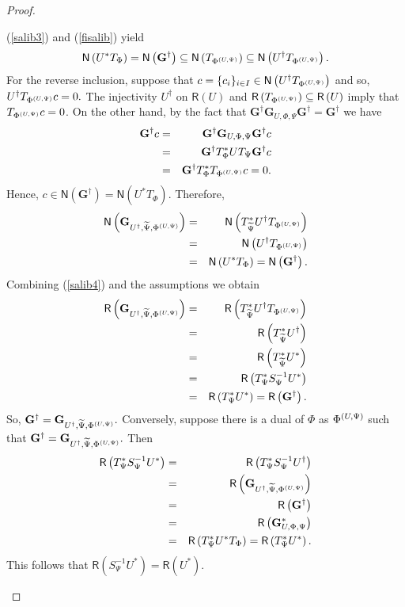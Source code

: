 \documentclass{birkjour}
\theoremstyle{definition}
\theoremstyle{remark}
\numberwithin{equation}{section}
\newcommand{\range}[1]{\mathsf{R}\left( #1 \right)}
\newcommand{\kernel}[1]{\mathsf{N}\left( #1 \right)}
\begin{document}
\begin{proof}
\begin{enumerate}
(\ref{salib3}) and (\ref{fisalib}) yield
\begin{eqnarray*}
\kernel{U^*T_{\Phi}}=\kernel{\mathbf{G}^{\dag}}\subseteq
\kernel{T_{\Phisd}}\subseteq \kernel{U^\dag T_{\Phisd}}.
\end{eqnarray*}
  For the reverse inclusion, suppose that
$c=\{c_i\}_{i\in I}\in \kernel{U^{\dag}T_{\Phisd}}$ and so,
$U^{\dag}T_{\Phi^{\left(U,\Psi\right)}}c=0.$  The injectivity $U^{\dag}$  on $\range{U}$  and  $\range{T_{\Phisd}}\subseteq \range{U}$  imply that  $T_{\Phi^{\left(U,\Psi\right)}}c=0$. On the other hand, by the fact that  $
\mathbf{G^{\dag}}\mathbf{G}_{U,\Phi,\Psi}\mathbf{G^{\dag}}=\mathbf{G^{\dag}}$
 we have
 \begin{eqnarray*}
 \mathbf{G^{\dag}}c&=&\mathbf{G^{\dag}}\mathbf{G}_{U,\Phi,\Psi}\mathbf{G^{\dag}}c\\
 &=& \mathbf{G^{\dag}}T_{\Phi}^*UT_{\Psi} \mathbf{G^{\dag}}c\\
 &=& \mathbf{G^{\dag}}T_{\Phi}^*T_{\Phi^{\left(U,\Psi\right)}}c=0.
 \end{eqnarray*}
 Hence, $c\in \kernel{\mathbf{G^{\dag}}}=\kernel{U^*T_{\Phi}}$. Therefore,
\begin{eqnarray*}
\kernel{\mathbf{G}_{U^{\dag},\widetilde{\Psi},\Phisd}}&=&
\kernel{T_{\widetilde{\Psi}}^*U^{\dag}T_{\Phisd}}\\
&=&\kernel{U^{\dag}T_{\Phisd}}\\
&=&   \kernel{U^*T_{\Phi}}=\kernel{\mathbf{G}^{\dag}}.\\
\end{eqnarray*}
Combining (\ref{salib4}) and the assumptions we obtain
\begin{eqnarray*}
\range{\mathbf{G}_{U^{\dag},\widetilde{\Psi},\Phisd}}&=&\range{T_{\widetilde{\Psi}}^*U^{\dag}T_{\Phisd}}\\
&=&\range{T_{\widetilde{\Psi}}^*U^{\dag}}\\
&=&\range{T_{\widetilde{\Psi}}^*U^{*}}\\
  &=&\range{T_{\Psi}^*S_{\Psi}^{-1}U^*}\\
&=&\range{T_{\Psi}^*U^{*}}=\range{\mathbf{G}^{\dag}}.
\end{eqnarray*}
So,
$\mathbf{G}^{\dag}=\mathbf{G}_{U^{\dag},\widetilde{\Psi},\Phi^{\left(U,\Psi\right)}}.$
 Conversely, suppose there is a  dual of $\Phi$ as $\Phi^{\left(U,\Psi\right)}$
such that
$\mathbf{G}^{\dag}=\mathbf{G}_{U^{\dag},\widetilde{\Psi},\Phi^{\left(U,\Psi\right)}}.$
Then
\begin{eqnarray*}
\range{T_{\Psi}^*S_{\Psi}^{-1}U^*}&=&\range{T_{\Psi}^*S_{\Psi}^{-1}U^\dagger}\\
&=&\range{\mathbf{G}_{U^{\dag},\widetilde{\Psi},\Phisd}}\\
&=&\range{\mathbf{G}^{\dag}}\\
&=&\range{\mathbf{G}_{U,\Phi,\Psi}^*}\\
&=& \range{T_{\Psi}^*U^*T_{\Phi}}=\range{T_{\Psi}^*U^*}.
\end{eqnarray*}
This follows that $\range{S_{\Psi}^{-1}U^*}=\range{U^*}.$


\end{enumerate}
\end{proof}
\end{document}
